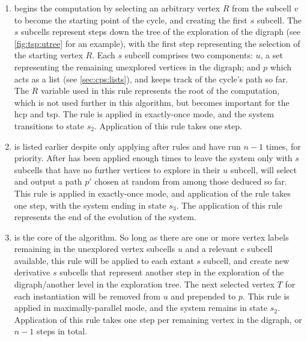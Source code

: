 \begin{enumerate}
    \item {} begins the computation by selecting an arbitrary vertex \(R\) from the subcell \(v\) to become the starting point of the cycle, and creating the first \(s\) subcell.  The \(s\) subcells represent steps down the tree of the exploration of the digraph (see \cref{fig:tsp:utree} for an example), with the first step representing the selection of the starting vertex \(R\).  Each \(s\) subcell comprises two components: \(u\), a set representing the remaining unexplored vertices in the digraph; and \(p\) which acts as a list (see \cref{sec:cps:lists}), and keeps track of the cycle's path so far.  The \(R\) variable used in this rule represents the root of the computation, which is not used further in this algorithm, but becomes important for the \gls{hcp} and \gls{tsp}.  The rule is applied in exactly-once mode, and the system transitions to state \(s_2\).  Application of this rule takes one step.
    \item {} is listed earlier despite only applying after rules  and  have run \(n - 1\) times, for priority.  After  has been applied enough times to leave the system only with \(s\) subcells that have no further vertices to explore in their \(u\) subcell,  will select and output a path \(p'\) chosen at random from among those deduced so far.  This rule is applied in exactly-once mode, and application of the rule takes one step, with the system ending in state \(s_3\).  The application of this rule represents the end of the evolution of the system.
    \item {} is the core of the algorithm.  So long as there are one or more vertex labels remaining in the unexplored vertex subcells \(u\) and a relevant \(e\) subcell available, this rule will be applied to each extant \(s\) subcell, and create new derivative \(s\) subcells that represent another step in the exploration of the digraph/another level in the exploration tree.  The next selected vertex \(T\) for each instantiation will be removed from \(u\) and prepended to \(p\).  This rule is applied in maximally-parallel mode, and the system remains in state \(s_2\).  Application of this rule takes one step per remaining vertex in the digraph, or \(n - 1\) steps in total.

\end{enumerate}
